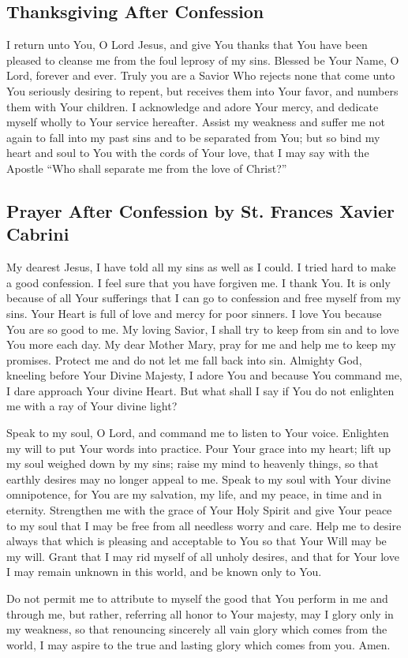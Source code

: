 \documentclass[12pt]{article}
\newcommand{\prayertitle}[1]{\subsection{#1}}
\begin{document}
\prayertitle{Thanksgiving After Confession}
I return unto You, O Lord Jesus, and give You thanks that You have been pleased to cleanse me from the foul leprosy of my sins.
Blessed be Your Name, O Lord, forever and ever.
Truly you are a Savior Who rejects none that come unto You seriously desiring to repent, but receives them into Your favor, and numbers them with Your children.
I acknowledge and adore Your mercy, and dedicate myself wholly to Your service hereafter.
Assist my weakness and suffer me not again to fall into my past sins and to be separated from You;
but so bind my heart and soul to You with the cords of Your love, that I may say with the Apostle ``Who shall separate me from the love of Christ?''

\prayertitle{Prayer After Confession by St. Frances Xavier Cabrini}
My dearest Jesus, I have told all my sins as well as I could.
I tried hard to make a good confession.
I feel sure that you have forgiven me.
I thank You.
It is only because of all Your sufferings that I can go to confession and free myself from my sins.
Your Heart is full of love and mercy for poor sinners.
I love You because You are so good to me.
My loving Savior, I shall try to keep from sin and to love You more each day.
My dear Mother Mary, pray for me and help me to keep my promises.
Protect me and do not let me fall back into sin.
Almighty God, kneeling before Your Divine Majesty, I adore You and because You command me, I dare approach Your divine Heart.
But what shall I say if You do not enlighten me with a ray of Your divine light?

Speak to my soul, O Lord, and command me to listen to Your voice.
Enlighten my will to put Your words into practice.
Pour Your grace into my heart;
lift up my soul weighed down by my sins;
raise my mind to heavenly things, so that earthly desires may no longer appeal to me.
Speak to my soul with Your divine omnipotence, for You are my salvation, my life, and my peace, in time and in eternity.
Strengthen me with the grace of Your Holy Spirit and give Your peace to my soul that I may be free from all needless worry and care.
Help me to desire always that which is pleasing and acceptable to You so that Your Will may be my will.
Grant that I may rid myself of all unholy desires, and that for Your love I may remain unknown in this world, and be known only to You.

Do not permit me to attribute to myself the good that You perform in me and through me, but rather, referring all honor to Your majesty, may I glory only in my weakness, so that renouncing sincerely all vain glory which comes from the world, I may aspire to the true and lasting glory which comes from you. Amen.
\end{document}
